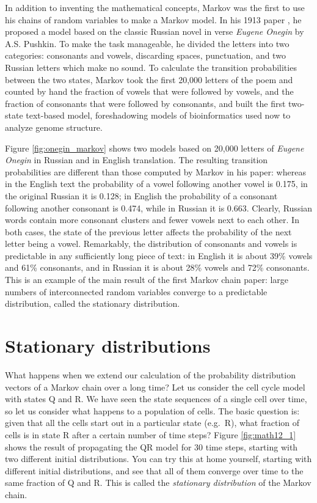 \documentclass[
  letterpaper,
  DIV=11,
  numbers=noendperiod]{scrreprt}
\begin{document}
In addition to inventing the mathematical concepts, Markov was the first
to use his chains of random variables to make a Markov model. In his
1913 paper \cite{markov_example_1913}, he proposed a model based on the
classic Russian novel in verse \emph{Eugene Onegin} by A.S. Pushkin. To
make the task manageable, he divided the letters into two categories:
consonants and vowels, discarding spaces, punctuation, and two Russian
letters which make no sound. To calculate the transition probabilities
between the two states, Markov took the first 20,000 letters of the poem
and counted by hand the fraction of vowels that were followed by vowels,
and the fraction of consonants that were followed by consonants, and
built the first two-state text-based model, foreshadowing models of
bioinformatics used now to analyze genome structure.

Figure \ref{fig:onegin_markov} shows two models based on 20,000 letters
of \emph{Eugene Onegin} in Russian and in English translation. The
resulting transition probabilities are different than those computed by
Markov in his paper: whereas in the English text the probability of a
vowel following another vowel is 0.175, in the original Russian it is
0.128; in English the probability of a consonant following another
consonant is 0.474, while in Russian it is 0.663. Clearly, Russian words
contain more consonant clusters and fewer vowels next to each other. In
both cases, the state of the previous letter affects the probability of
the next letter being a vowel. Remarkably, the distribution of
consonants and vowels is predictable in any sufficiently long piece of
text: in English it is about 39\% vowels and 61\% consonants, and in
Russian it is about 28\% vowels and 72\% consonants. This is an example
of the main result of the first Markov chain paper: large numbers of
interconnected random variables converge to a predictable distribution,
called the stationary distribution.

\hypertarget{stationary-distributions}{%
\section{Stationary distributions}\label{stationary-distributions}}

What happens when we extend our calculation of the probability
distribution vectors of a Markov chain over a long time? Let us consider
the cell cycle model with states Q and R. We have seen the state
sequences of a single cell over time, so let us consider what happens to
a population of cells. The basic question is: given that all the cells
start out in a particular state (e.g.~R), what fraction of cells is in
state R after a certain number of time steps? Figure \ref{fig:math12_1}
shows the result of propagating the QR model for 30 time steps, starting
with two different initial distributions. You can try this at home
yourself, starting with different initial distributions, and see that
all of them converge over time to the same fraction of Q and R. This is
called the \emph{stationary distribution} of the Markov chain.
\end{document}
